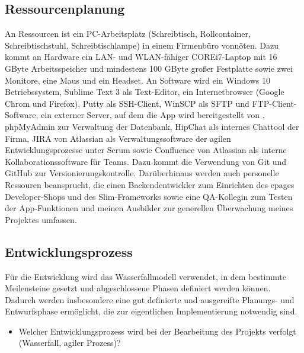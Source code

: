 \subsection{Ressourcenplanung}
\label{sec:Ressourcenplanung}

An Ressourcen ist ein PC-Arbeitsplatz (Schreibtisch, Rollcontainer, Schreibtischstuhl, Schreibtischlampe) in einem Firmenbüro vonnöten. Dazu kommt an Hardware ein LAN- und WLAN-fähiger COREi7-Laptop mit 16 GByte Arbeitsspeicher und mindestens 100 GByte großer Festplatte sowie zwei Monitore, eine Maus und ein Headset. An Software wird ein Windows 10 Betriebssystem, Sublime Text 3 als Text-Editor, ein Internetbrowser (Google Chrom und Firefox), Putty als \acs{SSH}-Client, Win\acs{SCP} als \acs{SFTP} und \acs{FTP}-Client-Software, ein externer Server, auf dem die App  wird bereitgestellt von , phpMyAdmin zur Verwaltung der Datenbank, HipChat als internes Chattool der Firma, JIRA von Atlassian als Verwaltungssoftware der agilen Entwicklungsprozesse unter Scrum sowie Confluence von Atlassian als interne Kollaborationssoftware für Teams. Dazu kommt die Verwendung von \acs{Git} und \acs{GitHub} zur Versionierungskontrolle. Darüberhinaus werden auch personelle Ressouren beansprucht, die einen Backendentwickler zum Einrichten des epages Developer-Shops und des Slim-Frameworks sowie eine \acs{QA}-Kollegin zum Testen der App-Funktionen und meinen Ausbilder zur generellen Überwachung meines Projektes umfassen.


\subsection{Entwicklungsprozess}
\label{sec:Entwicklungsprozess}

Für die Entwicklung wird das Wasserfallmodell verwendet, in dem bestimmte Meilensteine gesetzt und abgeschlossene Phasen definiert werden können. Dadurch werden insbesondere eine gut definierte und ausgereifte Planungs- und Entwurfsphase ermöglicht, die zur eigentlichen Implementierung notwendig sind. 
\begin{itemize}
	\item Welcher Entwicklungsprozess wird bei der Bearbeitung des Projekts verfolgt (\zB Wasserfall, agiler Prozess)?
\end{itemize}
